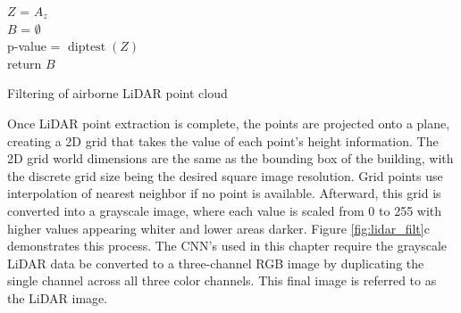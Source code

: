\begin{algorithm}[H]

    $Z$ = $A_z$ \\
    $B$ = $\emptyset$ \\
    p-value = $\operatorname{diptest}(Z)$ \\
    return $B$
    \caption{Filtering of airborne LiDAR point cloud}
    \label{alg:filter}
\end{algorithm}
\vspace{12PT}


Once LiDAR point extraction is complete, the points are projected onto a plane, creating a 2D grid that takes the value of each point's height information. The 2D grid world dimensions are the same as the bounding box of the building, with the discrete grid size being the desired square image resolution. Grid points use interpolation of nearest neighbor if no point is available. Afterward, this grid is converted into a grayscale image, where each value is scaled from 0 to 255 with higher values appearing whiter and lower areas darker. Figure \ref{fig:lidar_filt}c demonstrates this process. The \ac{CNN}'s used in this chapter require the grayscale LiDAR data be converted to a three-channel RGB image by duplicating the single channel across all three color channels. This final image is referred to as the LiDAR image.

